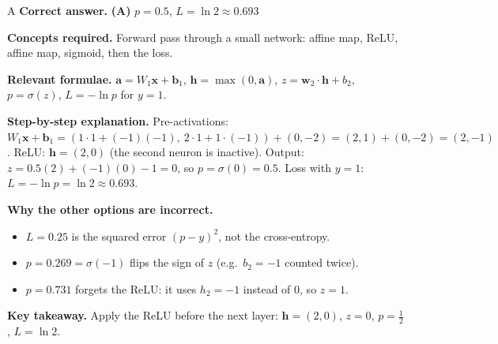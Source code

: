 \documentclass[11pt,a4paper]{article}
\newcommand{\qsep}{\par\vspace{2pt}{\color{black!15}\hrule}\vspace{4pt}}
\begin{document}
\begin{solbox}{A}
\textbf{\color{brand}Correct answer.} \textcolor{okgreen}{\textbf{(A)}} $p = 0.5$, $L = \ln 2 \approx 0.693$

\textbf{\color{brand}Concepts required.} Forward pass through a small network: affine map, ReLU, affine map, sigmoid, then the loss.

\textbf{\color{brand}Relevant formulae.} $\mathbf a = W_1\mathbf x + \mathbf b_1$, $\mathbf h = \max(0, \mathbf a)$, $z = \mathbf w_2\cdot\mathbf h + b_2$, $p = \sigma(z)$, $L = -\ln p$ for $y = 1$.

\textbf{\color{brand}Step-by-step explanation.} Pre-activations: $W_1\mathbf x + \mathbf b_1 = (1\cdot1 + (-1)(-1),\ 2\cdot1 + 1\cdot(-1)) + (0, -2) = (2, 1) + (0, -2) = (2, -1)$.
ReLU: $\mathbf h = (2, 0)$ (the second neuron is inactive). Output: $z = 0.5(2) + (-1)(0) - 1 = 0$, so $p = \sigma(0) = 0.5$.
Loss with $y = 1$: $L = -\ln p = \ln 2 \approx 0.693$.

\textbf{\color{brand}Why the other options are incorrect.}
\begin{itemize}[leftmargin=2.4em, itemsep=1pt, topsep=2pt]
\item[\textbf{(B)}] $L = 0.25$ is the squared error $(p - y)^2$, not the cross-entropy.
\item[\textbf{(C)}] $p = 0.269 = \sigma(-1)$ flips the sign of $z$ (e.g.\ $b_2 = -1$ counted twice).
\item[\textbf{(D)}] $p = 0.731$ forgets the ReLU: it uses $h_2 = -1$ instead of $0$, so $z = 1$.
\end{itemize}
\textbf{\color{brand}Key takeaway.} Apply the ReLU before the next layer: $\mathbf h = (2, 0)$, $z = 0$, $p = \frac12$, $L = \ln2$.
\end{solbox}
\qsep
\end{document}
